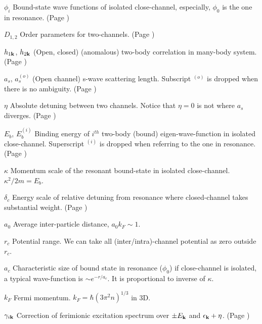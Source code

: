\documentclass[edeposit,fullpage,prequest]{uiucthesis2009}
\begin{document}
\begin{symbollist}[0.7in]
\item[$\phi_{i}$] Bound-state wave functions of  isolated close-channel, especially, $\phi_{0}$ is the one in resonance. (Page \pageref{eq:pathInt2:phi})
\item[$D_{1,2}$] Order parameters for two-channels. (Page \pageref{eq:pathInt2:Ddef})
\item[$h_{1\mathbf{k}}$, $ h_{2\mathbf{k}}$] (Open, closed) (anomalous) two-body correlation in many-body system. (Page \pageref{eq:pathInt2:h2})
\item[$a_{s}$, $a_{s}^{(o)}$] (Open channel) s-wave scattering length. Subscript ${}^{(o)}$ is dropped when there is no ambiguity. (Page \pageref{sec:intro:as})
\item[$\eta$] Absolute detuning between two channels. Notice that $\eta=0$ is not where $a_{s}$ diverges. (Page \pageref{eq:intro:ham})
\item[$E_{b}$, $E_{b}^{(i)}$] Binding energy of $i^{th}$ two-body (bound) eigen-wave-function in isolated close-channel.  Superscript ${}^{(i)}$ is dropped when referring to the one in resonance. (Page \pageref{eq:intro:sch2})
\item[$\kappa$] Momentum scale of the resonant bound-state in isolated close-channel.  $\kappa^{2}/2m=E_{b}$.
\item[$\delta_{c}$] Energy scale of relative detuning from resonance where closed-channel takes substantial weight. (Page \pageref{eq:intro:deltaC})
\item[$a_{0}$] Average inter-particle distance, $a_{0}k_{F}\sim1$.
\item[$r_{c}$] Potential range.  We can take all (inter/intra)-channel potential as zero outside $r_{c}$.
\item[$a_{c}$] Characteristic size of bound state in resonance ($\phi_{0}$) if close-channel is isolated, a typical wave-function is $\sim{}e^{-r/a_{c}}$. It is proportional  to inverse of $\kappa$.
\item[$k_{F}$] Fermi momentum. $k_{F}=\hbar(3\pi^{2}n)^{1/3}$ in 3D.
\item[$\gamma_{i\mathbf{k}}$] Correction of ferimionic excitation spectrum over $\pm{}E_{\mathbf{k}}$ and $\epsilon_{\mathbf{k}}+\eta$. (Page \pageref{eq:pathInt2:xiExpand})


\end{symbollist}
\end{document}
